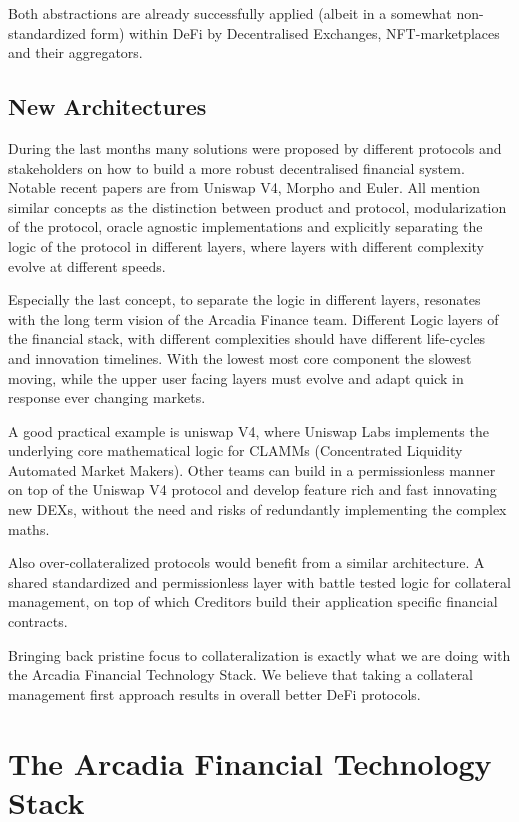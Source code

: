 \documentclass[sigconf,nonacm]{acmart}
\begin{document}
Both abstractions are already successfully applied (albeit in a somewhat non-standardized form) within DeFi by Decentralised Exchanges, NFT-marketplaces and their aggregators.

\subsection{New Architectures}
During the last months many solutions were proposed by different protocols and stakeholders on how to build a more robust decentralised financial system.
Notable recent papers are from Uniswap V4\cite{adams2023uniswap}, Morpho\cite{gontier2023morpho} and Euler\cite{euler2023protocols}.
All mention similar concepts as the distinction between product and protocol, modularization of the protocol, oracle agnostic implementations and explicitly separating the logic of the protocol in different layers,
where layers with different complexity evolve at different speeds.

Especially the last concept, to separate the logic in different layers, resonates with the long term vision of the Arcadia Finance team.
Different Logic layers of the financial stack, with different complexities should have different life-cycles and innovation timelines.
With the lowest most core component the slowest moving, while the upper user facing layers must evolve and adapt quick in response ever changing markets.

A good practical example is uniswap V4, where Uniswap Labs implements the underlying core mathematical logic for CLAMMs (Concentrated Liquidity Automated Market Makers).
Other teams can build in a permissionless manner on top of the Uniswap V4 protocol and develop feature rich and fast innovating new DEXs, without the need and risks of redundantly implementing the complex maths.

Also over-collateralized protocols would benefit from a similar architecture.
A shared standardized and permissionless layer with battle tested logic for collateral management, on top of which Creditors build their application specific financial contracts.

Bringing back pristine focus to collateralization is exactly what we are doing with the Arcadia Financial Technology Stack.
We believe that taking a collateral management first approach results in overall better DeFi protocols.


\section{The Arcadia Financial Technology Stack}
\end{document}
